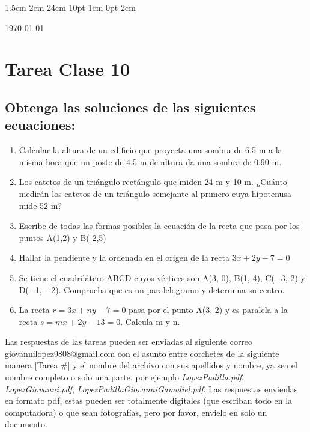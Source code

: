 \documentclass[12pt,letterpaper]{report}
\begin{document}
\setmargins{2.5cm}      
{1.5cm}                     
{2cm}  
{24cm}                    
{10pt}                          
{1cm}                          
{0pt}                             
{2cm}
\begin{flushright}
\today
\end{flushright}
\vspace{-1.75cm}
\section*{Tarea Clase 10}
\subsection*{Obtenga las soluciones de las siguientes ecuaciones:}
\begin{enumerate}
\item Calcular la altura de un edificio que proyecta una sombra de 6.5 m a la misma hora que un poste de 4.5 m de altura da una sombra de 0.90 m.
\item Los catetos de un triángulo rectángulo que miden 24 m y 10 m. ¿Cuánto medirán los catetos de un triángulo semejante al primero cuya hipotenusa mide 52 m?
\item Escribe de todas las formas posibles la ecuación de la recta que pasa por los puntos A(1,2) y B(-2,5)
\item Hallar la pendiente y la ordenada en el origen de la recta $3x+2y-7=0$
\item Se tiene el cuadrilátero ABCD cuyos vértices son A(3, 0), B(1, 4), C(−3, 2) y D(−1, −2). Comprueba que es un paralelogramo y determina su centro.
\item La recta $r=3x+ny-7=0$ pasa por el punto A(3, 2) y es paralela a la recta $s=mx+2y-13=0$. Calcula m y n.
\end{enumerate}
Las respuestas de las tareas pueden ser enviadas al siguiente correo giovannilopez9808@gmail.com con el asunto entre corchetes de la siguiente manera [Tarea \#] y el nombre del archivo con sus apellidos y nombre, ya sea el nombre completo o solo una parte, por ejemplo \textit{LopezPadilla.pdf}, \textit{LopezGiovanni.pdf}, \textit{LopezPadillaGiovanniGamaliel.pdf}. Las respuestas envienlas en formato pdf, estas pueden ser totalmente digitales (que escriban todo en la computadora) o que sean fotografías, pero por favor, envielo en solo un documento.
\end{document}
